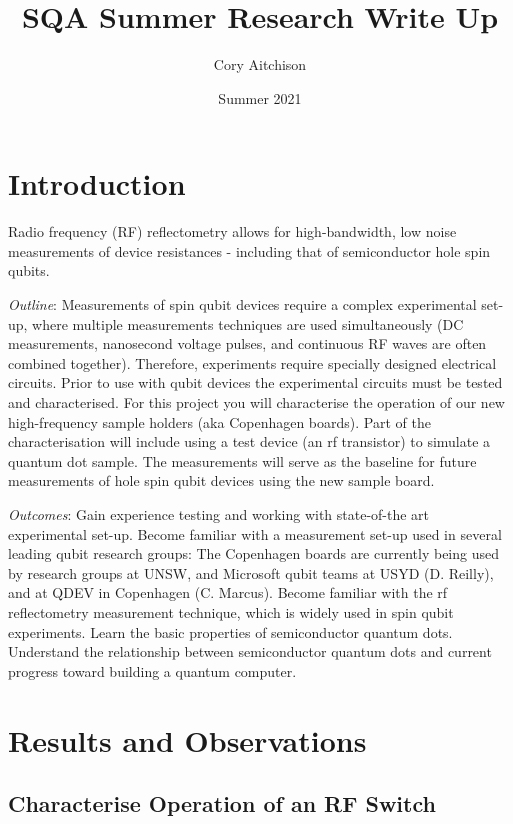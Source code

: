 \documentclass{article}
\title{SQA Summer Research Write Up}
\author{Cory Aitchison}
\date{Summer 2021}
\begin{document}
\maketitle


\section{Introduction}

Radio frequency (RF) reflectometry allows for high-bandwidth, low noise measurements of device resistances - including that of semiconductor hole spin qubits.

\emph{Outline}: Measurements of spin qubit devices require a complex experimental set-up, where multiple measurements techniques are used simultaneously (DC measurements, nanosecond voltage pulses, and continuous RF waves are often combined together). Therefore, experiments require specially designed electrical circuits. Prior to use with qubit devices the experimental circuits must be tested and characterised. For this project you will characterise the operation of our new high-frequency sample holders (aka Copenhagen boards). Part of the characterisation will include using a test device (an rf transistor) to simulate a quantum dot sample. The measurements will serve as the baseline for future measurements of hole spin qubit devices using the new sample board.

\emph{Outcomes}: Gain experience testing and working with state-of-the art experimental set-up. Become familiar with a measurement set-up used in several leading qubit research groups: The Copenhagen boards are currently being used by research groups at UNSW, and Microsoft qubit teams at USYD (D. Reilly), and at QDEV in Copenhagen (C. Marcus). Become familiar with the rf reflectometry measurement technique, which is widely used in spin qubit experiments. Learn the basic properties of semiconductor quantum dots. Understand the relationship between semiconductor quantum dots and current progress toward building a quantum computer.

\section{Results and Observations}
\subsection{Characterise Operation of an RF Switch}
\end{document}
